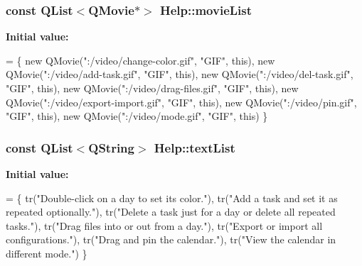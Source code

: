 \subsubsection[{\texorpdfstring{movie\+List}{movieList}}]{\setlength{\rightskip}{0pt plus 5cm}const Q\+List$<$Q\+Movie$\ast$$>$ Help\+::movie\+List\hspace{0.3cm}{\ttfamily [private]}}\hypertarget{classHelp_add4de4d4640b971e5e80fac57f027099}{}\label{classHelp_add4de4d4640b971e5e80fac57f027099}
{\bfseries Initial value\+:}
\begin{DoxyCode}
= \{
        \textcolor{keyword}{new} QMovie(\textcolor{stringliteral}{":/video/change-color.gif"}, \textcolor{stringliteral}{"GIF"}, \textcolor{keyword}{this}),
        \textcolor{keyword}{new} QMovie(\textcolor{stringliteral}{":/video/add-task.gif"}, \textcolor{stringliteral}{"GIF"}, \textcolor{keyword}{this}),
        \textcolor{keyword}{new} QMovie(\textcolor{stringliteral}{":/video/del-task.gif"}, \textcolor{stringliteral}{"GIF"}, \textcolor{keyword}{this}),
        \textcolor{keyword}{new} QMovie(\textcolor{stringliteral}{":/video/drag-files.gif"}, \textcolor{stringliteral}{"GIF"}, \textcolor{keyword}{this}),
        \textcolor{keyword}{new} QMovie(\textcolor{stringliteral}{":/video/export-import.gif"}, \textcolor{stringliteral}{"GIF"}, \textcolor{keyword}{this}),
        \textcolor{keyword}{new} QMovie(\textcolor{stringliteral}{":/video/pin.gif"}, \textcolor{stringliteral}{"GIF"}, \textcolor{keyword}{this}),
        \textcolor{keyword}{new} QMovie(\textcolor{stringliteral}{":/video/mode.gif"}, \textcolor{stringliteral}{"GIF"}, \textcolor{keyword}{this})
    \}
\end{DoxyCode}
\subsubsection[{\texorpdfstring{text\+List}{textList}}]{\setlength{\rightskip}{0pt plus 5cm}const Q\+List$<$Q\+String$>$ Help\+::text\+List\hspace{0.3cm}{\ttfamily [private]}}\hypertarget{classHelp_a0c53a50be73195a84b7828ff0f576430}{}\label{classHelp_a0c53a50be73195a84b7828ff0f576430}
{\bfseries Initial value\+:}
\begin{DoxyCode}
= \{
        tr(\textcolor{stringliteral}{"Double-click on a day to set its color."}),
        tr(\textcolor{stringliteral}{"Add a task and set it as repeated optionally."}),
        tr(\textcolor{stringliteral}{"Delete a task just for a day or delete all repeated tasks."}),
        tr(\textcolor{stringliteral}{"Drag files into or out from a day."}),
        tr(\textcolor{stringliteral}{"Export or import all configurations."}),
        tr(\textcolor{stringliteral}{"Drag and pin the calendar."}),
        tr(\textcolor{stringliteral}{"View the calendar in different mode."})
    \}
\end{DoxyCode}
